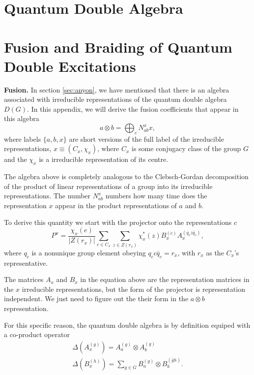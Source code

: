 \documentclass[two column]{article}
\begin{document}
\section{Quantum Double Algebra}

\section{Fusion and Braiding of Quantum Double Excitations}\label{app:fusion}\label{app:braid}

\textbf{Fusion.} In section \ref{sec:anyon}, we have mentioned that there is an algebra associated with irreducible representations of the quantum double algebra $D(G)$. In this appendix, we will derive the fusion coefficients that appear in this algebra
\begin{equation}
	a \otimes b = \bigoplus_c N_{ab}^x x,
\end{equation}
where labels $\{a,b,x\}$ are short versions of the full label of the irreducible representations, $x \equiv (C_x, \chi_x)$, where $C_x$ is some conjugacy class of the group $G$ and the $\chi_x$ is a irreducible representation of its centre.

The algebra above is completely analogous to the Clebsch-Gordan decomposition of the product of linear representations of a group into its irreducible representations. The number $N_{ab}^x$ numbers how many time does the representation $x$ appear in the product representations of $a$ and $b$.

To derive this quantity we start with the projector onto the representations $c$
\begin{equation}
	P^x = \frac{\chi_x(e)}{|Z(r_x)|}\sum_{c \in C_x}\sum_{z \in Z(r_x)}\chi_x^*(z)B_x^{(c)}A_x^{(q_c z \bar{q}_c)},
\end{equation}
where $q_c$ is a nonunique group element obeying $q_c c \bar{q}_c = r_x$, with $r_x$ as the $C_x$'s representative.

The matrices $A_x$ and $B_x$ in the equation above are the representation matrices in the $x$ irreducible representations, but the form of the projector is representation independent. We just need to figure out the their form in the $a\otimes b$ representation.

For this specific reason, the quantum double algebra is by definition equiped with a co-product operator
\begin{equation}\begin{split}
	\Delta(A_x^{(g)}) = A_a^{(g)} \otimes A_b^{(g)}\\
	\Delta(B_x^{(h)}) = \sum_{g \in G} B_a^{(g)}\otimes B_b^{(\bar{g}h)}.
\end{split}\end{equation}
\end{document}

